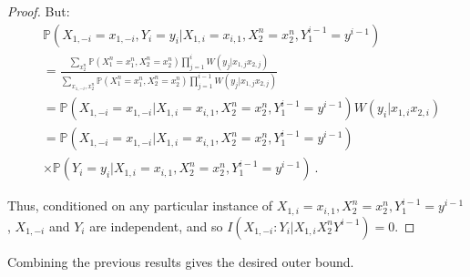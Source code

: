 \begin{proof}
        But:
        \begin{equation}
          \begin{aligned}
            &\mathbb{P}\left(X_{1,-i}=x_{1,-i},Y_i=y_i|X_{1,i}=x_{i,1}, X_2^n=x_2^n, Y_1^{i-1}=y^{i-1}\right)\\
            &= \frac{\sum_{x_2^n}\mathbb{P}\left(X_1^n=x_1^n,X_2^n=x_2^n\right)\prod_{j=1}^{i} W(y_j|x_{1,j}x_{2,j})}{\sum_{x_{1,-i},x_2^n}\mathbb{P}\left(X_1^n=x_1^n,X_2^n=x_2^n\right)\prod_{j=1}^{i-1} W(y_j|x_{1,j}x_{2,j})} \\
            &= \mathbb{P}\left(X_{1,-i}=x_{1,-i}|X_{1,i}=x_{i,1}, X_2^n=x_2^n, Y_1^{i-1}=y^{i-1}\right) W(y_i|x_{1,i}x_{2,i})\\
            &= \mathbb{P}\left(X_{1,-i}=x_{1,-i}|X_{1,i}=x_{i,1}, X_2^n=x_2^n, Y_1^{i-1}=y^{i-1}\right)\\
            &\times \mathbb{P}\left(Y_i=y_i|X_{1,i}=x_{i,1}, X_2^n=x_2^n, Y_1^{i-1}=y^{i-1}\right) \ .
          \end{aligned}
        \end{equation}

        Thus, conditioned on any particular instance of $X_{1,i}=x_{i,1}, X_2^n=x_2^n, Y_1^{i-1}=y^{i-1}$, $X_{1,-i}$ and $Y_i$ are independent, and so $I(X_{1,-i}:Y_i|X_{1,i}X_2^nY^{i-1}) = 0$.
      \end{proof}

	Combining the previous results gives the desired outer bound.

